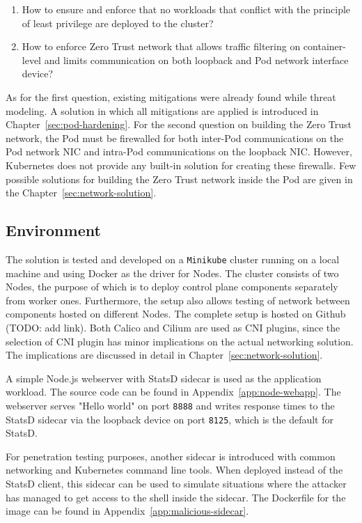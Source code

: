 \documentclass[english, 12pt, a4paper, sci, utf8, a-2b, online]{aaltothesis}
\begin{document}
\begin{enumerate}
  \item How to ensure and enforce that no workloads that conflict with the principle of least privilege are deployed to the cluster?
  \item How to enforce Zero Trust network that allows traffic filtering on container-level and limits communication on both loopback and Pod network interface device?
\end{enumerate}

As for the first question, existing mitigations were already found while threat modeling.
A solution in which all mitigations are applied is introduced in Chapter~\ref{sec:pod-hardening}.
For the second question on building the Zero Trust network, the Pod must be firewalled for both inter-Pod communications on the Pod network NIC and intra-Pod communications on the loopback NIC.
However, Kubernetes does not provide any built-in solution for creating these firewalls.
Few possible solutions for building the Zero Trust network inside the Pod are given in the Chapter~\ref{sec:network-solution}.


\subsection{Environment}

The solution is tested and developed on a \texttt{Minikube} cluster running on a local machine and using Docker as the driver for Nodes.
The cluster consists of two Nodes, the purpose of which is to deploy control plane components separately from worker ones.
Furthermore, the setup also allows testing of network between components hosted on different Nodes.
The complete setup is hosted on Github (TODO: add link).
Both Calico and Cilium are used as CNI plugins, since the selection of CNI plugin has minor implications on the actual networking solution.
The implications are discussed in detail in Chapter~\ref{sec:network-solution}.

A simple Node.js webserver with StatsD sidecar is used as the application workload.
The source code can be found in Appendix~\ref{app:node-webapp}.
The webserver serves "Hello world" on port \texttt{8888} and writes response times to the StatsD sidecar via the loopback device on port \texttt{8125}, which is the default for StatsD.

For penetration testing purposes, another sidecar is introduced with common networking and Kubernetes command line tools.
When deployed instead of the StatsD client, this sidecar can be used to simulate situations where the attacker has managed to get access to the shell inside the sidecar.
The Dockerfile for the image can be found in Appendix~\ref{app:malicious-sidecar}.
\end{document}
